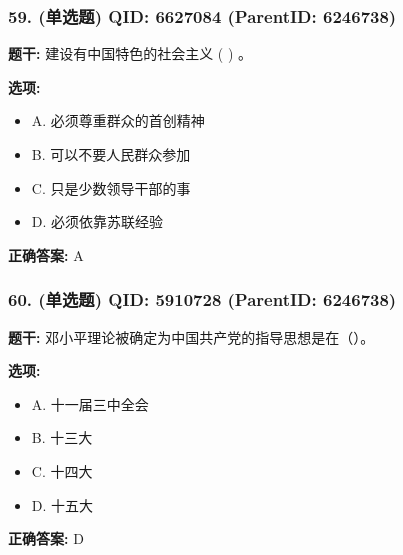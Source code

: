 \documentclass[12pt,UTF8]{ctexart}
\begin{document}
\vspace{0.3em}\hrulefill\vspace{0.7em}

\subsubsection*{59. (单选题) \small QID: 6627084 (ParentID: 6246738)}

\textbf{题干:}
建设有中国特色的社会主义  ( )  。



\textbf{选项:}
\begin{itemize}[leftmargin=*]

  \item A. 必须尊重群众的首创精神

  \item B. 可以不要人民群众参加

  \item C. 只是少数领导干部的事

  \item D. 必须依靠苏联经验

\end{itemize}

\textbf{正确答案:}
A

\vspace{0.3em}\hrulefill\vspace{0.7em}

\subsubsection*{60. (单选题) \small QID: 5910728 (ParentID: 6246738)}

\textbf{题干:}
邓小平理论被确定为中国共产党的指导思想是在（）。



\textbf{选项:}
\begin{itemize}[leftmargin=*]

  \item A. 十一届三中全会

  \item B. 十三大

  \item C. 十四大

  \item D. 十五大

\end{itemize}

\textbf{正确答案:}
D

\vspace{0.3em}\hrulefill\vspace{0.7em}
\end{document}

